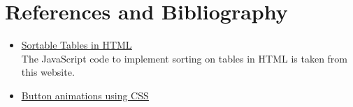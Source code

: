 \documentclass[12pt]{report}
\begin{document}
    \vfill \pagebreak

    \section*{References and Bibliography}

    \begin{itemize}
        \item \href{https://mdbootstrap.com/docs/b4/jquery/tables/sort/}{\color{blue}\underline{Sortable Tables in HTML}} \\
        The JavaScript code to implement sorting on tables in HTML is taken from this website.
        \item \href{https://www.w3schools.com/howto/howto_css_animate_buttons.asp}{\color{blue}\underline{Button animations using CSS}}
    \end{itemize}
\end{document}
